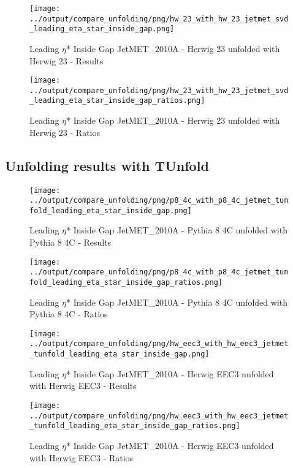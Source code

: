 \documentclass[11pt]{book}
\begin{document}
\begin{figure}[ht]
\centering
\texttt{[image: ../output/compare\_unfolding/png/hw\_23\_with\_hw\_23\_jetmet\_svd\_leading\_eta\_star\_inside\_gap.png]}
\caption{Leading $\eta$* Inside Gap JetMET\_2010A - Herwig 23 unfolded with Herwig 23 - Results}
\label{hw_23_hw_23_jetmet_svd_leading_eta_star_inside_gap_a}
\end{figure}

\begin{figure}[ht]
\centering
\texttt{[image: ../output/compare\_unfolding/png/hw\_23\_with\_hw\_23\_jetmet\_svd\_leading\_eta\_star\_inside\_gap\_ratios.png]}
\caption{Leading $\eta$* Inside Gap JetMET\_2010A - Herwig 23 unfolded with Herwig 23 - Ratios}
\label{hw_23_hw_23_jetmet_svd_leading_eta_star_inside_gap_b}
\end{figure}


\clearpage
\subsection{Unfolding results with TUnfold}

\begin{figure}[ht]
\centering
\texttt{[image: ../output/compare\_unfolding/png/p8\_4c\_with\_p8\_4c\_jetmet\_tunfold\_leading\_eta\_star\_inside\_gap.png]}
\caption{Leading $\eta$* Inside Gap JetMET\_2010A - Pythia 8 4C unfolded with Pythia 8 4C - Results}
\label{p8_p8_jetmet_tunfold_leading_eta_star_inside_gap_a}
\end{figure}

\begin{figure}[ht]
\centering
\texttt{[image: ../output/compare\_unfolding/png/p8\_4c\_with\_p8\_4c\_jetmet\_tunfold\_leading\_eta\_star\_inside\_gap\_ratios.png]}
\caption{Leading $\eta$* Inside Gap JetMET\_2010A - Pythia 8 4C unfolded with Pythia 8 4C - Ratios}
\label{p8_p8_jetmet_tunfold_leading_eta_star_inside_gap_b}
\end{figure}

\begin{figure}[ht]
\centering
\texttt{[image: ../output/compare\_unfolding/png/hw\_eec3\_with\_hw\_eec3\_jetmet\_tunfold\_leading\_eta\_star\_inside\_gap.png]}
\caption{Leading $\eta$* Inside Gap JetMET\_2010A - Herwig EEC3 unfolded with Herwig EEC3 - Results}
\label{hw_eec3_hw_eec3_jetmet_tunfold_leading_eta_star_inside_gap_a}
\end{figure}

\begin{figure}[ht]
\centering
\texttt{[image: ../output/compare\_unfolding/png/hw\_eec3\_with\_hw\_eec3\_jetmet\_tunfold\_leading\_eta\_star\_inside\_gap\_ratios.png]}
\caption{Leading $\eta$* Inside Gap JetMET\_2010A - Herwig EEC3 unfolded with Herwig EEC3 - Ratios}
\label{hw_eec3_hw_eec3_jetmet_tunfold_leading_eta_star_inside_gap_b}
\end{figure}
\end{document}
